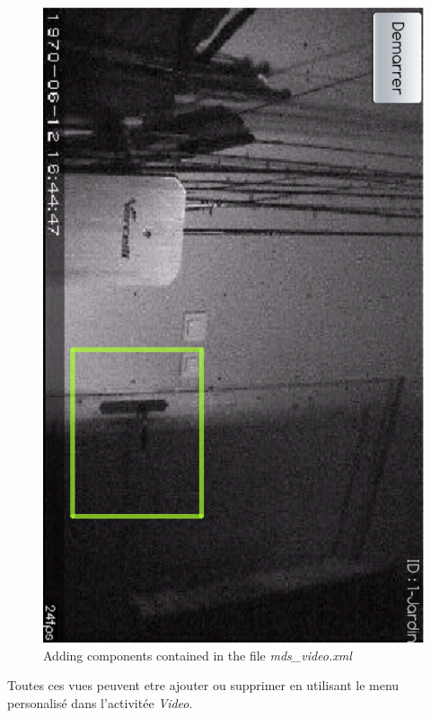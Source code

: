\begin{center}
\begin{figure}[H] 
  \label{videoViewMD}
  \centering
   \includegraphics[angle=90,scale=0.3]{Images/videoViewMD.eps}
  \caption{Adding components contained in the file \textit{mds\_video.xml}}
\end{figure}  
\end{center}

Toutes ces vues peuvent etre ajouter ou supprimer en utilisant le menu
personalisé dans l'activitée \textit{Video}.

